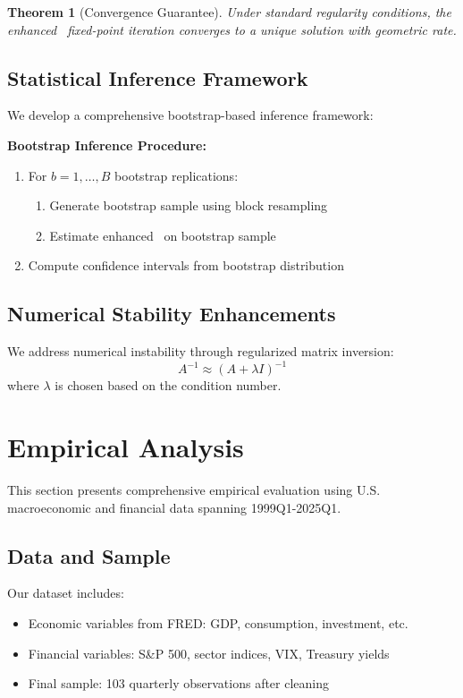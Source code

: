 \documentclass[12pt,letterpaper]{article}
\newtheorem{theorem}{Theorem}
\newcommand{\clarx}{\text{(C)LARX}}
\begin{document}
\begin{theorem}[Convergence Guarantee]
Under standard regularity conditions, the enhanced \clarx\ fixed-point iteration converges to a unique solution with geometric rate.
\end{theorem}

\subsection{Statistical Inference Framework}

We develop a comprehensive bootstrap-based inference framework:

\textbf{Bootstrap Inference Procedure:}
\begin{enumerate}
\item For $b = 1, \ldots, B$ bootstrap replications:
\begin{enumerate}
\item Generate bootstrap sample using block resampling
\item Estimate enhanced \clarx\ on bootstrap sample
\end{enumerate}
\item Compute confidence intervals from bootstrap distribution
\end{enumerate}

\subsection{Numerical Stability Enhancements}

We address numerical instability through regularized matrix inversion:
\begin{equation}
A^{-1} \approx (A + \lambda I)^{-1}
\end{equation}
where $\lambda$ is chosen based on the condition number.

\section{Empirical Analysis}

This section presents comprehensive empirical evaluation using U.S. macroeconomic and financial data spanning 1999Q1-2025Q1.

\subsection{Data and Sample}

Our dataset includes:
\begin{itemize}
\item Economic variables from FRED: GDP, consumption, investment, etc.
\item Financial variables: S\&P 500, sector indices, VIX, Treasury yields
\item Final sample: 103 quarterly observations after cleaning
\end{itemize}
\end{document}
